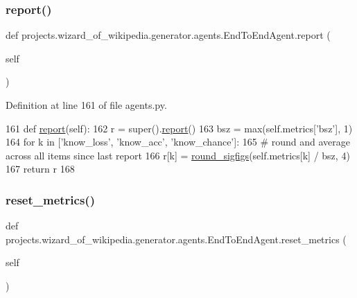 \subsubsection{\texorpdfstring{report()}{report()}}
{\footnotesize\ttfamily def projects.\+wizard\+\_\+of\+\_\+wikipedia.\+generator.\+agents.\+End\+To\+End\+Agent.\+report (\begin{DoxyParamCaption}\item[{}]{self }\end{DoxyParamCaption})}



Definition at line 161 of file agents.\+py.


\begin{DoxyCode}
161     \textcolor{keyword}{def }\hyperlink{namespaceprojects_1_1convai2_1_1eval__f1_a01a47b9c08dad189837a51f085defc45}{report}(self):
162         r = super().\hyperlink{namespaceprojects_1_1convai2_1_1eval__f1_a01a47b9c08dad189837a51f085defc45}{report}()
163         bsz = max(self.metrics[\textcolor{stringliteral}{'bsz'}], 1)
164         \textcolor{keywordflow}{for} k \textcolor{keywordflow}{in} [\textcolor{stringliteral}{'know\_loss'}, \textcolor{stringliteral}{'know\_acc'}, \textcolor{stringliteral}{'know\_chance'}]:
165             \textcolor{comment}{# round and average across all items since last report}
166             r[k] = \hyperlink{namespaceparlai_1_1agents_1_1legacy__agents_1_1seq2seq_1_1utils__v0_af377ec61bfc0423461e7b409ffc883b9}{round\_sigfigs}(self.metrics[k] / bsz, 4)
167         \textcolor{keywordflow}{return} r
168 
\end{DoxyCode}
\mbox{\label{classprojects_1_1wizard__of__wikipedia_1_1generator_1_1agents_1_1EndToEndAgent_a6c75fa85fe522f4e5e0c35b3db5dfebc}} 
\subsubsection{\texorpdfstring{reset\+\_\+metrics()}{reset\_metrics()}}
{\footnotesize\ttfamily def projects.\+wizard\+\_\+of\+\_\+wikipedia.\+generator.\+agents.\+End\+To\+End\+Agent.\+reset\+\_\+metrics (\begin{DoxyParamCaption}\item[{}]{self }\end{DoxyParamCaption})}



